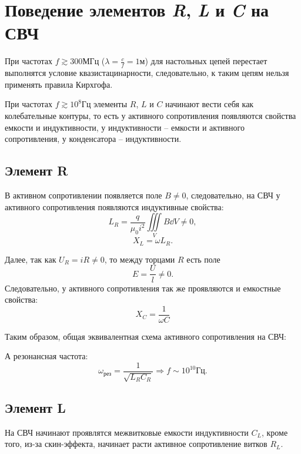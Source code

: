 \section{Поведение элементов \textit{R}, \textit{L} и \textit{C} на СВЧ}

    При частотах \( f \gtrsim 300 \)МГц (\( \lambda = \frac{c}{f} = 1 \)м) для
    настольных цепей перестает выполнятся условие квазистацинарности,
    следовательно, к таким цепям нельзя применять правила Кирхгофа.
    
    При частотах \( f \gtrsim 10^8 \)Гц элементы \( R \), \( L \) и \( C \)
    начинают вести себя как колебательные контуры, то есть у активного
    сопротивления появляются свойства емкости и индуктивности, у индуктивности
    -- емкости и активного сопротивления, у конденсатора -- индуктивности.
    
    \subsection{Элемент R}
    
        В активном сопротивлении появляется поле \( B \ne 0 \), следовательно,
        на СВЧ у активного сопротивления появляются индуктивные свойства:
        \[
            L_R = \frac{q}{\mu_0 i^2}\iiint\limits_V B\dd V \ne 0,
        \]
        \[
            X_L = \omega L_R.
        \]
        
        Далее, так как \( U_R = iR \ne 0 \), то между торцами \( R \) есть поле
        \[
            E = \frac{U}{l} \ne 0.
        \]
        Следовательно, у активного сопротивления так же проявляются и емкостные
        свойства:
        \[
            X_C = \frac{1}{\omega C}
        \]
        
        Таким образом, общая эквивалентная схема активного сопротивления на СВЧ:
        
        А резонансная частота:
        \[
            \omega_{\textit{рез}} = \frac{1}{\sqrt{L_RC_R}} \Rightarrow 
            f \sim 10^{10} \text{Гц}.
        \]
    
    \subsection{Элемент L}
    
        На СВЧ начинают проявлятся межвитковые емкости индуктивности \( C_L \),
        кроме того, из-за скин-эффекта, начинает расти активное сопротивление
        витков \( R_L \).
    
